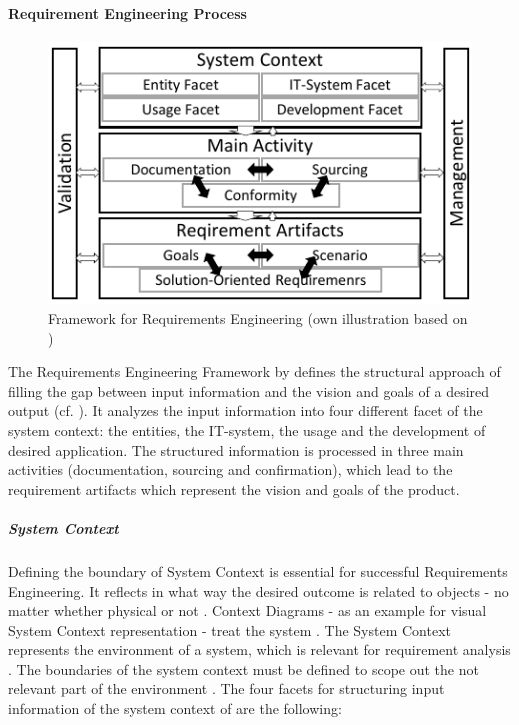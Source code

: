\paragraph{Requirement Engineering Process} 
\begin{figure}[H]
    \centering
    \includegraphics[scale=1.5]{img/ReqAnFrameWork.pdf}
    \caption[Framework for Requirements Engineering]{Framework for Requirements Engineering (own illustration based on \cite[41]{Pohl.2007})}
    \label{fig:reqFramework}
\end{figure}
The Requirements Engineering Framework by \textcite{Pohl.2007} defines the structural approach of filling the gap between input information and the vision and goals of a desired output (cf. ). It analyzes the input information into four different facet of the system context: the entities, the IT-system, the usage and the development of desired application. The structured information is processed in three main activities (documentation, sourcing and confirmation), which lead to the requirement artifacts which represent the vision and goals of the product. \parencite[][38-39]{Pohl.2007}
\subparagraph{System Context}
Defining the boundary of System Context is essential for successful Requirements Engineering. It reflects in what way the desired outcome is related to objects - no matter whether physical or not \parencite[55]{Pohl.2007}. Context Diagrams - as an example for visual System Context representation - treat the system  \parencite[76]{Lauesen.2008}. The System Context represents the environment of a system, which is relevant for requirement analysis \parencite[55]{Pohl.2007}. The boundaries of the system context must be defined to scope out the not relevant part of the environment \parencite[55-56]{Pohl.2007}. The four facets for structuring input information of the system context of \textcite{Pohl.2007} are the following:
